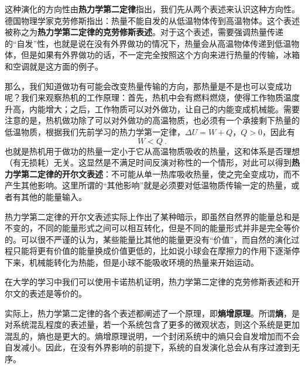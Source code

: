 这种演化的方向性由\textbf{热力学第二定律}指出，我们先从两个表述来认识这种方向性。德国物理学家克劳修斯指出：热量不能自发的从低温物体传到高温物体。这个表述被称之为\textbf{热力学第二定律的克劳修斯表述}。对于这个表述，需要强调热量传递的“自发”性，也就是说在没有外界做功的情况下，热量会从高温物体传递到低温物体，但是如果有外界做功的话，不一定完全按照这个方向来进行热量的传输，冰箱和空调就是这方面的例子。

那么，我们知道做功有可能会改变热量传输的方向，那热量是不是也可以变成功呢？我们来观察热机的工作原理：首先，热机中会有燃料燃烧，使得工作物质温度升高，内能增大；之后，工作物质可以对外做功，让自己的内能变成机械能。需要注意的是，热机做功除了可以对外做功的高温物质，也必须有一个承接剩下热量的低温物质，根据我们先前学习的热力学第一定律，$\Delta U=W+Q$，$Q>0$，因此有
$$W<Q~.$$
也就是热机用于做功的热量一定小于它从高温物质吸收的热量，这和体系是否理想（有无损耗）无关。这显然是不满足时间反演对称性的一个情形，对此可以得到\textbf{热力学第二定律的开尔文表述}：不可能从单一热库吸收热量，使之完全变成功，而不产生其他影响。这里所谓的“其他影响”就是必须要对低温物质传输一定的热量，或者有其他的能量输入。

热力学第二定律的开尔文表述实际上作出了某种暗示，即虽然自然界的能量总和是不变的，不同的能量形式之间可以相互转化，但是不同的能量形式并非是完全等价的。可以很不严谨的认为，某些能量比其他的能量更没有“价值”，而自然的演化过程只能将更有价值的能量换成价值更低的，比如说小球会在摩擦力的作用下逐渐停下来，机械能转化为热能，但是小球不能吸收环境的热量来开始运动。

在大学的学习中我们可以使用卡诺热机证明，热力学第二定律的克劳修斯表述和开尔文的表述是等价的。

实际上，热力学第二定律的各个表述都阐述了一个原理，即\textbf{熵增原理}。所谓\textbf{熵}，是对系统混乱程度的表述量，若一个系统包含了更多的微观状态，则这个系统是更加混乱的，熵也是更大的。熵增原理说明，一个封闭系统中的熵只会自发增加而不会自发减小。因此，在没有外界影响的前提下，系统的自发演化总会从有序过渡到无序。

